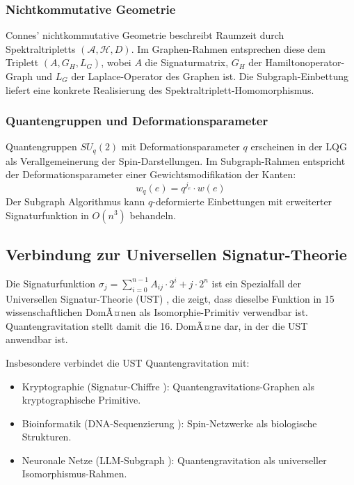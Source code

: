 ﻿\documentclass[a4paper,12pt]{article}
\theoremstyle{definition}
\begin{document}
\subsubsection{Nichtkommutative Geometrie}

Connes' nichtkommutative Geometrie \cite{connes1994} beschreibt
Raumzeit durch Spektraltripletts $(\mathcal{A}, \mathcal{H}, D)$.
Im Graphen-Rahmen entsprechen diese dem Triplett $(A, G_H, L_G)$,
wobei $A$ die Signaturmatrix, $G_H$ der Hamiltonoperator-Graph und
$L_G$ der Laplace-Operator des Graphen ist. Die Subgraph-Einbettung
liefert eine konkrete Realisierung des Spektraltriplett-Homomorphismus.

\subsubsection{Quantengruppen und Deformationsparameter}

Quantengruppen $SU_q(2)$ mit Deformationsparameter $q$ erscheinen
in der LQG als Verallgemeinerung der Spin-Darstellungen.
Im Subgraph-Rahmen entspricht der Deformationsparameter einer
Gewichtsmodifikation der Kanten:
\[
w_q(e) = q^{j_e} \cdot w(e)
\]
Der Subgraph Algorithmus kann $q$-deformierte Einbettungen mit
erweiterter Signaturfunktion in $O(n^3)$ behandeln.

\subsection{Verbindung zur Universellen Signatur-Theorie}

Die Signaturfunktion $\sigma_j = \sum_{i=0}^{n-1} A_{ij} \cdot 2^i + j \cdot 2^n$
ist ein Spezialfall der Universellen Signatur-Theorie (UST)
\cite{epp2026ust}, die zeigt, dass dieselbe Funktion in 15
wissenschaftlichen DomÃ¤nen als Isomorphie-Primitiv verwendbar ist.
Quantengravitation stellt damit die 16. DomÃ¤ne dar, in der die
UST anwendbar ist.

Insbesondere verbindet die UST Quantengravitation mit:
\begin{itemize}
	\item Kryptographie (Signatur-Chiffre \cite{epp2026sigchiffre}):
	      Quantengravitations-Graphen als kryptographische Primitive.
	\item Bioinformatik (DNA-Sequenzierung \cite{epp2026dna}):
	      Spin-Netzwerke als biologische Strukturen.
	\item Neuronale Netze (LLM-Subgraph \cite{epp2026llm}):
	      Quantengravitation als universeller Isomorphismus-Rahmen.
\end{itemize}
\end{document}
